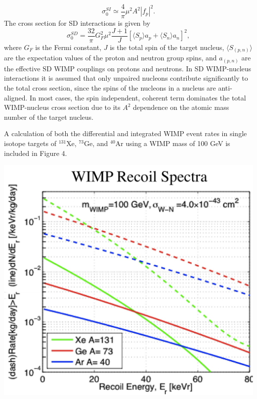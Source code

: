 \documentclass[a4paper,12pt]{article}
\begin{document}
\[\sigma_0^{SI} \simeq \frac{4}{\pi}\mu^2 A^2 |f_p|^2. \]
The cross section for SD interactions is given by
\[\sigma_0^{SD}=\frac{32}{\pi}G_F^2\mu^2\frac{J+1}{J}[\langle S_p \rangle a_p + \langle S_n \rangle a_n]^2, \]
where $G_F$ is the Fermi constant, $J$ is the total spin of the target nucleus, $\langle S_{(p,n)} \rangle$ are the expectation values of the proton and neutron group spins, and $a_{(p,n)}$ are the effective SD WIMP couplings on protons and neutrons.  In SD WIMP-nucleus interactions it is assumed that only unpaired nucleons contribute significantly to the total cross section, since the spins of the nucleons in a nucleus are anti-aligned.  In most cases, the spin independent, coherent term dominates the total WIMP-nucleus cross section due to its $A^2$ dependence on the atomic mass number of the target nucleus.

A calculation of both the differential and integrated WIMP event rates in single isotope targets of  $^{131}$Xe, $^{73}$Ge, and $^{40}$Ar using a WIMP mass of 100 GeV is included in Figure 4.

\begin{center}
\includegraphics[scale=0.5]{Recoil-spectrum.png}
\end{center}
\end{document}
